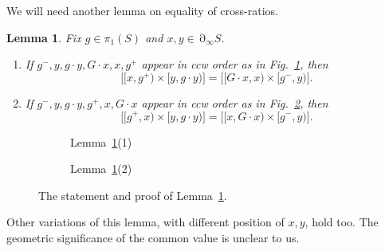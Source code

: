 \documentclass[11pt]{amsart}
\newcommand*{\svgfignormal}[1]{\fontsize{9pt}{9pt}\selectfont}
\numberwithin{equation}{section}
\numberwithin{figure}{section}
\newtheorem{lemma}[theorem]{Lemma}
\theoremstyle{definition}
\theoremstyle{plain}
\DeclareMathOperator{\bdy}{\partial}
\begin{document}
We will need another lemma on equality of cross-ratios.
\begin{lemma}\label{lem:cr-switcheroo}
  Fix $g \in \pi_1(S)$ and $x,y \in \bdy_\infty S$.
  
  \begin{enumerate} 
      \item If $g^-,y,g\cdot y, G \cdot x, x,g^+$
  appear in ccw order as in Fig.~\ref{fig:cr-geo1}, then
  \[
    \bigl[[x,g^+)\times[y,g \cdot y)\bigr]
      = \bigl[[G \cdot x,x)\times[g^-,y)\bigr].
  \]
  \item If $g^-,y,g\cdot y, g^+, x, G \cdot x$
  appear in ccw order as in Fig.~\ref{fig:cr-geo2}, then
  \[
    \bigl[[g^+,x)\times[y,g \cdot y)\bigr]
      = \bigl[[x,G \cdot x)\times[g^-,y)\bigr].
  \]
  \end{enumerate}
\end{lemma}


\begin{figure}
\centering

\begin{subfigure}{0.48\textwidth}
\centering
\resizebox{\linewidth}{!}{\svgfignormal{cr_geo}}
\caption{Lemma~\ref{lem:cr-switcheroo}(1)}
\label{fig:cr-geo1}
\end{subfigure}
\hfill
\begin{subfigure}{0.48\textwidth}
\centering
\resizebox{\linewidth}{!}{\svgfignormal{cr_geo2}}
\caption{Lemma~\ref{lem:cr-switcheroo}(2)}
\label{fig:cr-geo2}
\end{subfigure}

\caption{The statement and proof of Lemma~\ref{lem:cr-switcheroo}.}
\label{fig:cr-geo}
\end{figure}

Other variations of this lemma, with different position of $x,y$, hold
too. The geometric significance of
the common value is unclear to us.
\end{document}

